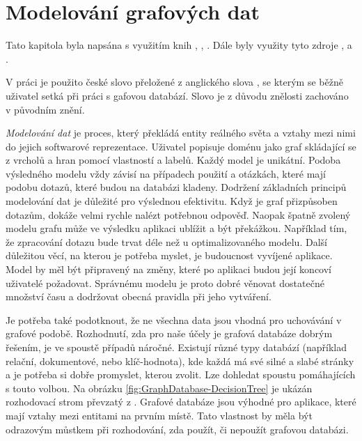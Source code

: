 \documentclass[
  program=infoi,
  biblatex=true,
  sourcecodes=true,
  figures=true,
  glossaries=false,
  index
]{kidiplom}
\begin{document}
\section{Modelování grafových dat}


Tato kapitola byla napsána s využitím knih \cite{inAction}, \cite{graphDatabases}, \cite{practitioner}. Dále byly využity tyto zdroje \cite{ionos}, \cite{macrometa} a \cite{neo4jDev}.

\begin{remark}[Překlad]
V práci je použito  české slovo  přeložené z anglického slova , se kterým se běžně uživatel setká při práci s gafovou databází. Slovo  je z důvodu znělosti zachováno v původním znění.
\end{remark}

\textit{Modelování dat} je proces, který překládá entity reálného světa a vztahy mezi nimi do jejich softwarové reprezentace. Uživatel popisuje doménu jako graf skládající se z vrcholů a hran pomocí vlastností a labelů. Každý model je unikátní. Podoba výsledného modelu vždy závisí na případech použití a otázkách, které mají podobu dotazů, které budou na databázi kladeny. Dodržení základních principů modelování dat je důležité pro výslednou efektivitu. Když je graf přizpůsoben dotazům, dokáže velmi rychle nalézt potřebnou odpověď. Naopak špatně zvolený modelu grafu může ve výsledku aplikaci ublížit a být překážkou. Například tím, že zpracování dotazu bude trvat déle než u optimalizovaného modelu. Další důležitou věcí, na kterou je potřeba myslet, je budoucnost vyvíjené aplikace. Model by měl být připravený na změny, které po aplikaci budou její koncoví uživatelé požadovat. Správnému modelu je proto dobré věnovat dostatečné množství času a dodržovat obecná pravidla při jeho vytváření. 

Je potřeba také podotknout, že ne všechna data jsou vhodná pro uchovávání v grafové podobě. Rozhodnutí, zda pro naše účely je grafová databáze dobrým řešením, je ve spoustě případů náročné. Existují různé typy databází (například relační, dokumentové, nebo klíč-hodnota), kde každá má své silné a slabé stránky a je potřeba si dobře promyslet, kterou zvolit. Lze dohledat spoustu  pomáhajících s touto volbou. Na obrázku \ref{fig:GraphDatabase-DecisionTree} je ukázán rozhodovací strom převzatý z \cite{inAction}. Grafové databáze jsou výhodné pro aplikace, které mají vztahy mezi entitami na prvním místě. Tato vlastnost by měla být odrazovým můstkem při rozhodování, zda použít, či nepoužít grafovou databázi.
\end{document}
